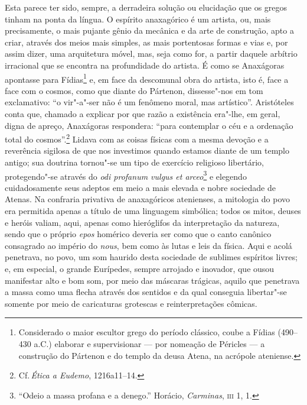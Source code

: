  Esta parece ter sido, sempre, a derradeira solução ou elucidação que os
 gregos tinham na ponta da língua. O espírito anaxagórico é um artista, ou,
 mais precisamente, o mais pujante gênio da mecânica e da arte de construção,
 apto a criar, através dos meios mais simples, as mais portentosas formas e
 vias e, por assim dizer, uma arquitetura móvel, mas, seja como for, a partir
 daquele arbítrio irracional que se encontra na profundidade do artista. É
 como se Anaxágoras apontasse para Fídias\footnote{ Considerado o maior
 escultor grego do período clássico, coube a Fídias (490--430 a.C.) elaborar
 e supervisionar --- por nomeação de Péricles --- a construção do Pártenon e do
 templo da deusa Atena, na acrópole ateniense.} e, em face da descomunal obra
 do artista, isto é, face a face com o cosmos, como que diante do Pártenon,
 dissesse"-nos em tom exclamativo: ``o vir"-a"-ser não é um fenômeno moral,
 mas artístico''. Aristóteles conta que, chamado a explicar por que razão a
 existência era"-lhe, em geral, digna de apreço, Anaxágoras respondera:
 ``para contemplar o céu e a ordenação total do cosmos''.\footnote
 { Cf.\,\textit{Ética a Eudemo}, 1216a11--14.} Lidava com as coisas físicas
 com a mesma devoção e a reverência sigilosa de que nos investimos quando
 estamos diante de um templo antigo; sua doutrina tornou"-se um tipo de
 exercício religioso libertário, protegendo"-se através do \textit{odi profanum 
 vulgus et arceo}\footnote{ ``Odeio a massa profana e a
 denego.'' Horácio, \textit{Carminas}, \textsc{iii} 1, 1.} e elegendo 
 cuidadosamente seus adeptos em meio a mais elevada e nobre sociedade de 
 Atenas. Na confraria privativa
 de anaxagóricos atenienses, a mitologia do povo era permitida apenas a
 título de uma linguagem simbólica; todos os mitos, deuses e heróis valiam,
 aqui, apenas como hieróglifos da interpretação da natureza, sendo que o
 próprio \textit{epos} homérico deveria ser como que o canto canônico
 consagrado ao império do \textit{nous}, bem como às lutas e leis da física.
 Aqui e acolá penetrava, no povo, um som haurido desta sociedade de sublimes
 espíritos livres; e, em especial, o grande Eurípedes, sempre arrojado e
 inovador, que ousou manifestar alto e bom som, por meio das máscaras
 trágicas, aquilo que penetrava a massa como uma flecha através dos sentidos
 e da qual conseguia libertar"-se somente por meio de caricaturas grotescas e
 reinterpretações cômicas.

